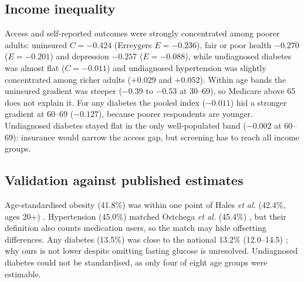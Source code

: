 \subsection{Income inequality}
Access and self-reported outcomes were strongly concentrated among poorer adults: uninsured $C=-0.424$ (Erreygers $E=-0.236$), fair or poor health $-0.270$ ($E=-0.201$) and depression $-0.257$ ($E=-0.088$), while undiagnosed diabetes was almost flat ($C=-0.011$) and undiagnosed hypertension was slightly concentrated among richer adults ($+0.029$ and $+0.052$). Within age bands the uninsured gradient was steeper ($-0.39$ to $-0.53$ at 30--69), so Medicare above 65 does not explain it. For any diabetes the pooled index ($-0.011$) hid a stronger gradient at 60--69 ($-0.127$), because poorer respondents are younger. Undiagnosed diabetes stayed flat in the only well-populated band ($-0.002$ at 60--69): insurance would narrow the access gap, but screening has to reach all income groups.



\subsection{Validation against published estimates}
Age-standardised obesity (41.8\%) was within one point of Hales \textit{et al.} (42.4\%, ages 20+) \cite{hales2020}. Hypertension (45.0\%) matched Ostchega \textit{et al.} (45.4\%) \cite{ostchega2020}, but their definition also counts medication users, so the match may hide offsetting differences. Any diabetes (13.5\%) was close to the national 13.2\% (12.0--14.5) \cite{cdc_ndsr}; why ours is not lower despite omitting fasting glucose is unresolved. Undiagnosed diabetes could not be standardised, as only four of eight age groups were estimable.
